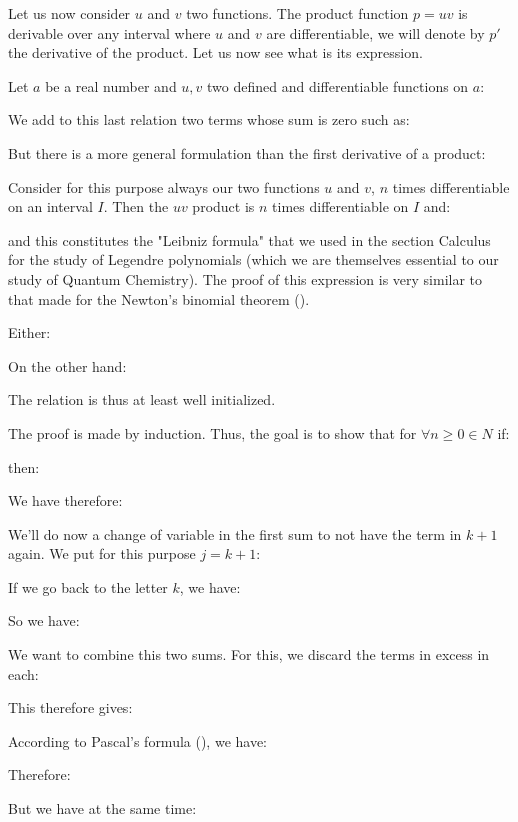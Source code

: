 \begin{enumerate}
		 Let us now consider $u$ and $v$ two functions. The product function $p=uv$ is derivable over any interval where $u$ and $v$ are differentiable, we will denote by $p'$ the derivative of the product. Let us now see what is its expression.
		 
		 Let $a$ be a real number and $u,v$ two defined and differentiable functions on $a$:
		 
		 
		 We add to this last relation two terms whose sum is zero such as:
		 
		 
		 But there is a more general formulation than the first derivative of a product:
		 \begin{theorem}
		 	Consider for this purpose always our two functions $u$ and $v$, $n$ times differentiable on an interval $I$. Then the $uv$ product is $n$ times differentiable on $I$ and:
		 		 	
		 	and this constitutes the "Leibniz formula" that we used in the section Calculus for the study of Legendre polynomials (which we are themselves essential to our study of Quantum Chemistry).
		 	The proof of this expression is very similar to that made for the Newton's binomial theorem ().
		 \end{theorem}
		 \begin{dem}
		 	Either:
		 	
		 	On the other hand:
		 	
		 	The relation is thus at least well initialized.
		 	
		 	The proof is made by induction. Thus, the goal is to show that for $\forall n \geq 0 \in N$ if:
		 	
		 	then:
		 	
		 	We have therefore:
		 	
		 	We'll do now a change of variable in the first sum to not have the term in $k + 1$ again. We put for this purpose $j=k+1$:
		 	
		 	If we go back to the letter $k$, we have:
		 	
		 	So we have:
		 	
		 	We want to combine this two sums. For this, we discard the terms in excess in each:
		 	
		 	This therefore gives:
		 	
		 	According to Pascal's formula (), we have:
		 	
		 	Therefore:
		 	
		 	But we have at the same time:
		 	

\end{dem}
\end{enumerate}
